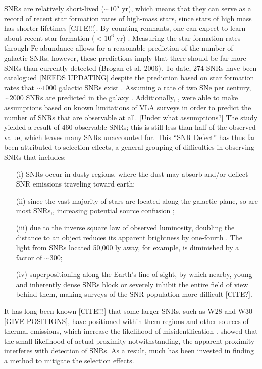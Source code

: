 \documentclass[12pt,preprint]{emulateapj}
\begin{document}
SNRs are relatively short-lived ($\sim10^5$ yr), which means that they can serve as a record of recent star formation rates of high-mass stars, since stars of high mass has shorter lifetimes {\color{red}[CITE!!!]}.  
By counting remnants, one can expect to learn about recent star formation ($<10^6$ yr) \citep[e.g.][]{brogan06}.  
Measuring the star formation rates through Fe abundance allows for a reasonable prediction of the number of galactic SNRs; however, these predictions imply that there should be far more SNRs than currently detected (Brogan et al. 2006).  
To date, 274 SNRs have been catalogued \citep{green09} [{\color{red}NEEDS UPDATING}] despite the prediction based on star formation rates that $\sim1000$ galactic SNRs exist \citep{li91}.  
Assuming a rate of two SNe per century, $\sim2000$ SNRs are predicted in the galaxy \citep{pavlovic13}.  
Additionally, \citet{brogan06}, were able to make assumptions based on known limitations of VLA surveys in order to predict the number of SNRs that are observable at all. {\color{red}[Under what assumptions?]}
The study yielded a result of 460 observable SNRs; this is still less than half of the observed value, which leaves many SNRs unaccounted for. 
This “SNR Defect” has thus far been attributed to selection effects, a general grouping of difficulties in observing SNRs that includes: 
\begin{itemize}
\item[(i)] SNRs occur in dusty regions, where the dust may absorb and/or deflect SNR emissions traveling toward earth;
\item[(ii)] since the vast majority of stars are located along the galactic plane, so are most SNRs,, increasing potential source confusion \citep[e.g.][]{gao11c};
\item[(iii)] due to the inverse square law of observed luminosity, doubling the distance to an object reduces its apparent brightness by one-fourth  \citep{green91}. The light from SNRs located 50,000 ly away, for example, is diminished by a factor of $\sim$300;
\item[(iv)] superpositioning along the Earth’s line of sight, by which nearby, young  and inherently dense SNRs block or severely inhibit the entire field of view behind them, making surveys of the SNR population more difficult {\color{red}[CITE?]}. 
\end{itemize}

It has long been known {\color{red}[CITE!!!]} that some larger SNRs, such as W28 and W30 {\color{red}[GIVE POSITIONS]}, have positioned within them  regions and other sources of thermal emissions, which increase the likelihood of misidentification \citep{andrews85}.  \cite{brogan06} showed that the small likelihood of actual proximity notwithstanding, the apparent proximity interferes with detection of SNRs.  As a result, much has been invested in finding a method to mitigate the selection effects. 
\end{document}
